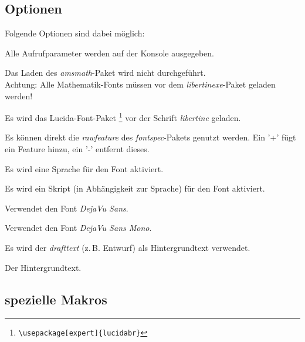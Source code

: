 \documentclass{fontdoku}
\begin{document}
\subsection{Optionen}

Folgende Optionen sind dabei möglich:
\begin{description}
\item [debug] Alle Aufrufparameter werden auf der Konsole ausgegeben.
\item [noamsmath] Das Laden des \emph{amsmath}-Paket wird nicht durchgeführt.\\
      Achtung: Alle Mathematik-Fonts müssen vor dem \emph{libertinexe}-Paket
      geladen werden!
\item [lucida] Es wird das Lucida-Font-Paket%
      \footnote{\texttt{\textbackslash usepackage[expert]\{lucidabr\}}}
      vor der Schrift \emph{libertine} geladen.
\item [rawfeature] Es können direkt die \emph{rawfeature} des \emph{fontspec}-Pakets genutzt werden.
      Ein '+' fügt ein Feature hinzu, ein '-' entfernt dieses.
\item [langauge] Es wird eine Sprache für den Font aktiviert.
\item [script]   Es wird ein Skript (in Abhängigkeit zur Sprache) für den Font aktiviert.
\item [dejavusans] Verwendet den Font \emph{DejaVu Sans}.
\item [dejavusansmono] Verwendet den Font \emph{DejaVu Sans Mono}.
\item [draft] Es wird der \emph{drafttext} (z.\,B. Entwurf) als Hintergrundtext verwendet.
\item [drafttext] Der Hintergrundtext.
\end{description}

\newpage
\subsection{spezielle Makros}
\end{document}
